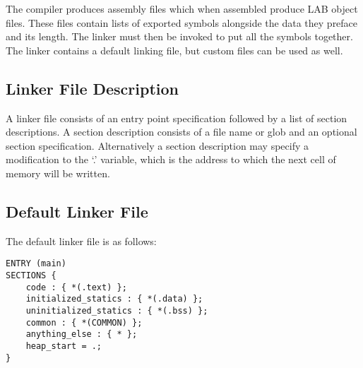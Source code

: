 \documentclass{article}
\begin{document}
The compiler produces assembly files which when assembled produce LAB object
files. These files contain lists of exported symbols alongside the data they
preface and its length. The linker must then be invoked to put all the symbols
together. The linker contains a default linking file, but custom files can be
used as well.


\subsection{Linker File Description}

A linker file consists of an entry point specification followed by a list of
section descriptions. A section description consists of a file name or glob and
an optional section specification. Alternatively a section description may
specify a modification to the `.' variable, which is the address to which the
next cell of memory will be written.

\subsection{Default Linker File}

The default linker file is as follows:

\begin{lstlisting}
ENTRY (main)
SECTIONS {
    code : { *(.text) };
    initialized_statics : { *(.data) };
    uninitialized_statics : { *(.bss) };
    common : { *(COMMON) };
    anything_else : { * };
    heap_start = .;
}
\end{lstlisting}
\end{document}
